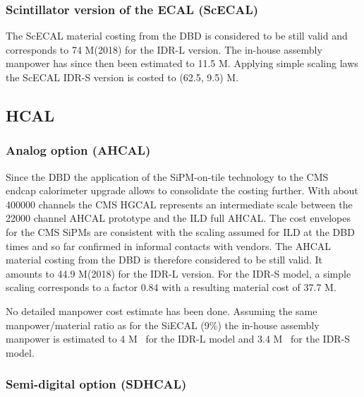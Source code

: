 
\subsubsection{Scintillator version of the ECAL (ScECAL)}
The ScECAL material costing from the DBD is considered to be still valid and corresponds to 74 M\texteuro(2018) for the IDR-L version. The in-house assembly manpower has since then been estimated to 11.5 M\texteuro. Applying simple scaling laws the ScECAL IDR-S version is costed to (62.5, 9.5) M\texteuro.

\subsection{HCAL}

\subsubsection{Analog option (AHCAL)}
Since the DBD the application of the SiPM-on-tile technology to the CMS endcap calorimeter upgrade allows to consolidate the costing further. With about 400000 channels the CMS HGCAL represents an intermediate scale between the 22000 channel AHCAL prototype and the ILD full AHCAL. 
The cost envelopes for the CMS SiPMs are consistent with the scaling assumed for ILD at the DBD times and so far confirmed in informal contacts with vendors. The AHCAL material costing from the DBD is therefore considered to be still valid. It amounts to 44.9 M\texteuro(2018) for the IDR-L version. 
For the IDR-S model, a simple scaling corresponds to a factor 0.84 with a resulting material cost of 37.7 M\texteuro.

No detailed manpower cost estimate has been done. Assuming the same manpower/material ratio as for the SiECAL (9\%) the in-house assembly manpower is estimated to 4 M\texteuro~ for the IDR-L model and 3.4 M\texteuro~ for the IDR-S model.

\subsubsection{Semi-digital option (SDHCAL)}

